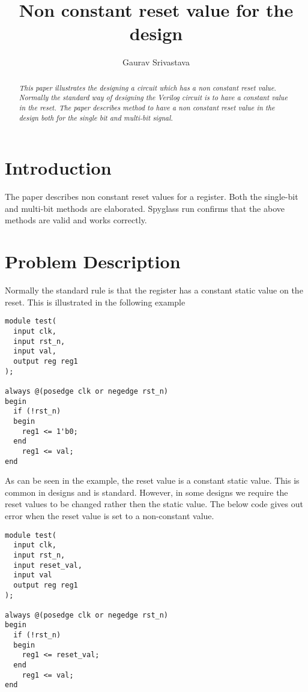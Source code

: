 \documentclass[twocolumn,10pt]{asme2ej}
\title{Non constant reset value for the design}
\author{Gaurav Srivastava
    \affiliation{
	Seattle, Washington 98012\\
    Email: gauravsri589@gmail.com
    }	
}
\begin{document}
\maketitle    

\begin{abstract}
{\it This paper illustrates the designing a circuit 
which has a non constant reset value. Normally the 
standard way of designing the Verilog circuit is to have a
constant value in the reset. The paper describes method to have
a non constant reset value in the design both for the single 
bit and multi-bit signal.
}
\end{abstract}

\section{Introduction}
The paper describes non constant reset values for a register. 
Both the single-bit and multi-bit methods are elaborated. 
Spyglass run confirms that the above methods are valid and works correctly. 

\section{Problem Description}
Normally the standard rule is that the register has a constant static value on the reset. This is illustrated in the following example

\begin{verbatim}
module test(
  input clk,
  input rst_n,
  input val,
  output reg reg1
);

always @(posedge clk or negedge rst_n) 
begin
  if (!rst_n) 
  begin
    reg1 <= 1'b0;
  end
    reg1 <= val;
end
\end{verbatim}

As can be seen in the example, the reset value is a constant static value. This is common in designs and is standard. However, in some designs we require the reset values to be changed rather then the static value. The below code gives out error when the reset value is set to a non-constant value. 

\begin{verbatim}
module test(
  input clk,
  input rst_n,
  input reset_val,
  input val
  output reg reg1
);

always @(posedge clk or negedge rst_n) 
begin
  if (!rst_n) 
  begin
    reg1 <= reset_val;
  end
    reg1 <= val;
end
\end{verbatim}
\end{document}
